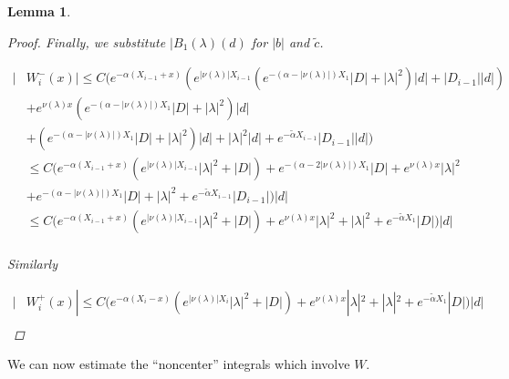 \documentclass[12pt]{article}
\newtheorem{lemma}{Lemma}
\begin{document}
\begin{lemma}
\begin{proof}
Finally, we substitute $|B_1(\lambda)(d)$ for $|b|$ and $\tilde{c}$.

\begin{align*}
| &W_i^-(x)| \leq C \Big(e^{-\alpha(X_{i-1} + x)}( e^{|\nu(\lambda)| X_{i-1}} ( e^{-(\alpha - |\nu(\lambda)|) X_1} |D| + |\lambda|^2 )|d| + |D_{i-1}||d| ) \\
&+ e^{\nu(\lambda)x} ( e^{-(\alpha - |\nu(\lambda)|) X_1} |D| + |\lambda|^2 )|d| \\ &+ ( e^{-(\alpha - |\nu(\lambda)|) X_1} |D| + |\lambda|^2 )|d| + |\lambda|^2 |d| + e^{-\tilde{\alpha} X_{i-1}} |D_{i-1}||d| \Big) \\
&\leq C \Big(e^{-\alpha(X_{i-1} + x)}( e^{|\nu(\lambda)| X_{i-1}} |\lambda|^2 + |D|)
+ e^{-(\alpha - 2 |\nu(\lambda)|) X_1} |D| + e^{\nu(\lambda)x} |\lambda|^2 \\ 
&+ e^{-(\alpha - |\nu(\lambda)|) X_1} |D| + |\lambda|^2 + e^{-\tilde{\alpha} X_{i-1}} |D_{i-1}| \Big) |d| \\
&\leq C \Big(e^{-\alpha(X_{i-1} + x)}( e^{|\nu(\lambda)| X_{i-1}} |\lambda|^2 + |D|) + e^{\nu(\lambda)x} |\lambda|^2 
+ |\lambda|^2 + e^{-\tilde{\alpha} X_1} |D| \Big) |d| \\
\end{align*}

Similarly

\begin{align*}
| &W_i^+(x)| \leq C \Big(e^{-\alpha(X_i - x)}( e^{|\nu(\lambda)| X_i} |\lambda|^2 + |D|) + e^{\nu(\lambda)x} |\lambda|^2 
+ |\lambda|^2 + e^{-\tilde{\alpha} X_1} |D| \Big) |d| \\
\end{align*}
\end{proof}
\end{lemma}

We can now estimate the ``noncenter'' integrals which involve $W$.
\end{document}

